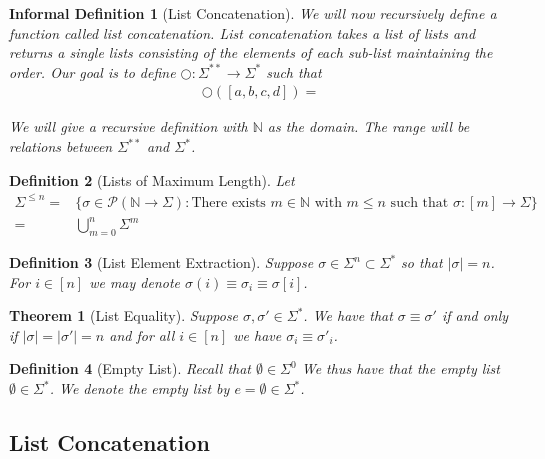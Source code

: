 \documentclass[12pt]{article}
\theoremstyle{break}
\newtheorem{definition}{Definition}[section]
\theoremstyle{break}
\newtheorem{theorem}{Theorem}[section]
\theoremstyle{break}
\theoremstyle{break}
\theoremstyle{break}
\newtheorem{informal definition}[definition]{Informal Definition}
\theoremstyle{break}
\newtheorem{informal theorem}[theorem]{Informal Theorem}
\newcommand{\natnum}[0]{\mathbb{N}}
\begin{document}
	\begin{informal definition}[List Concatenation]
		We will now recursively define a function called list concatenation. 
		List concatenation takes a list of lists and returns a single lists consisting of the elements of each sub-list maintaining the order.
		Our goal is to define $\bigcirc:\Sigma^{**} \to \Sigma^*$ such that
		\begin{align*}
			\bigcirc \left([a, b, c, d]\right) = 
		\end{align*}
		
		
		
		We will give a recursive definition with $\natnum$ as the domain.
		The range will be relations between $\Sigma^{**}$ and $\Sigma^*$.
	\end{informal definition}
	
	\begin{definition}[Lists of Maximum Length]
		Let
		\begin{align*}
			\Sigma^{\le n} =& \{\sigma \in \mathcal{P}(\mathbb{N} \to \Sigma): \text{There exists } m \in \mathbb{N} \text{ with } m \le n \text{ such that } \sigma: [m] \to \Sigma\}\\
			=& \bigcup_{m=0}^n \Sigma^m
		\end{align*}
	\end{definition}
	
	\begin{definition}[List Element Extraction]
		Suppose $\sigma \in \Sigma^n \subset \Sigma^*$ so that $|\sigma| = n$.
		For $i \in [n]$ we may denote $\sigma(i) \equiv \sigma_i \equiv \sigma[i]$.
	\end{definition}
	
	\begin{theorem}[List Equality]
		Suppose $\sigma, \sigma' \in \Sigma^*$.
		We have that $\sigma \equiv \sigma'$ if and only if $|\sigma| = |\sigma'|=n$ and for all $i \in [n]$ we have $\sigma_i \equiv \sigma'_i$.
	\end{theorem}
	
	\begin{definition}[Empty List]
		Recall that $\emptyset \in \Sigma^0$
		We thus have that the empty list $\emptyset \in \Sigma^*$.
		We denote the empty list by $e = \emptyset \in \Sigma^*$.
	\end{definition}
	
	
	\subsection{List Concatenation}
	
\end{document}

